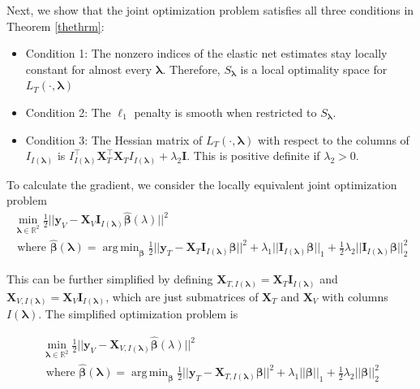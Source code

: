 \documentclass[10pt,letterpaper]{article}
\DeclareMathOperator*{\argmin}{arg\,min}
\begin{document}
Next, we show that the joint optimization problem satisfies all three conditions in Theorem \ref{thethrm}:
\begin{itemize}
\item[] Condition 1: The nonzero indices of the elastic net estimates stay locally constant for almost every $\boldsymbol{\lambda}$. Therefore, $S_{\boldsymbol{\lambda}}$ is a local optimality space for $L_T(\cdot, \boldsymbol{\lambda})$ \hfill {}
\item[] Condition 2: The $\ell_1$ penalty is smooth when restricted to $S_{\boldsymbol{\lambda}}$.\hfill {}
\item[] Condition 3: The Hessian matrix of $L_T(\cdot, \boldsymbol{\lambda})$ with respect to the columns of $I_{I(\boldsymbol \lambda)}$ is $I_{I(\boldsymbol \lambda)}^\top \boldsymbol{X}_{T}^\top \boldsymbol{X}_{T} I_{I(\boldsymbol \lambda)} + \lambda_2 \boldsymbol{I}$. This is positive definite if $\lambda_2 > 0$. \hfill {}
\end{itemize}

To calculate the gradient, we consider the locally equivalent joint optimization problem
\begin{equation}
\begin{array}{c}
\min_{\boldsymbol{\lambda} \in \mathbb{R}^2} \frac{1}{2} \lvert\lvert \boldsymbol{y}_V - \boldsymbol{X}_V \boldsymbol{I}_{I(\boldsymbol \lambda)} \hat{\boldsymbol{\beta}} (\lambda) \rvert\rvert ^2 \\
\text{ where }
\hat{\boldsymbol{\beta}} (\boldsymbol{\lambda}) = \argmin_{\boldsymbol{\beta}} \frac{1}{2} \lvert\lvert \boldsymbol{y}_T - \boldsymbol{X}_T \boldsymbol{I}_{I(\boldsymbol \lambda)} \boldsymbol{\beta} \rvert\rvert ^2
+ \lambda_1 \lvert\lvert \boldsymbol{I}_{I(\boldsymbol \lambda)} \boldsymbol{\beta} \rvert \rvert_1
+ \frac{1}{2}\lambda_2 \lvert\lvert \boldsymbol{I}_{I(\boldsymbol \lambda)} \boldsymbol{\beta} \rvert \rvert_2^2
\end{array}
\end{equation}

This can be further simplified by defining $\boldsymbol{X}_{T, I(\boldsymbol\lambda)} = \boldsymbol{X}_T \boldsymbol{I}_{I(\boldsymbol \lambda)}$ and $\boldsymbol{X}_{V, I(\boldsymbol\lambda)}  = \boldsymbol{X}_V \boldsymbol{I}_{I(\boldsymbol \lambda)}$, which are just submatrices of $\boldsymbol{X}_T$ and $\boldsymbol{X}_V$ with columns $I(\boldsymbol \lambda)$. The simplified optimization problem is

\begin{equation}
\begin{array}{c}
\min_{\boldsymbol{\lambda} \in \mathbb{R}^2} \frac{1}{2} \lvert\lvert \boldsymbol{y}_V - \boldsymbol{X}_{V, I(\boldsymbol \lambda)} \hat{\boldsymbol{\beta}} (\lambda) \rvert\rvert ^2 \\
\text{ where }
\hat{\boldsymbol{\beta}} (\boldsymbol{\lambda}) = \argmin_{\boldsymbol \beta} \frac{1}{2} \lvert\lvert \boldsymbol{y}_T - \boldsymbol{X}_{T, I(\boldsymbol \lambda)} \boldsymbol \beta \rvert\rvert ^2
+ \lambda_1 \lvert\lvert \boldsymbol \beta \rvert \rvert_1
+ \frac{1}{2}\lambda_2 \lvert\lvert \boldsymbol \beta \rvert \rvert_2^2
\end{array}
\end{equation}
\end{document}
